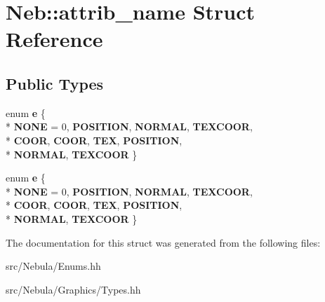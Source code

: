 \hypertarget{structNeb_1_1attrib__name}{\section{Neb\-:\-:attrib\-\_\-name Struct Reference}
\label{structNeb_1_1attrib__name}
}
\subsection*{Public Types}
\begin{DoxyCompactItemize}
\item 
enum {\bfseries e} \{ \\*
{\bfseries N\-O\-N\-E} = 0, 
{\bfseries P\-O\-S\-I\-T\-I\-O\-N}, 
{\bfseries N\-O\-R\-M\-A\-L}, 
{\bfseries T\-E\-X\-C\-O\-O\-R}, 
\\*
{\bfseries C\-O\-O\-R}, 
{\bfseries C\-O\-O\-R}, 
{\bfseries T\-E\-X}, 
{\bfseries P\-O\-S\-I\-T\-I\-O\-N}, 
\\*
{\bfseries N\-O\-R\-M\-A\-L}, 
{\bfseries T\-E\-X\-C\-O\-O\-R}
 \}
\item 
enum {\bfseries e} \{ \\*
{\bfseries N\-O\-N\-E} = 0, 
{\bfseries P\-O\-S\-I\-T\-I\-O\-N}, 
{\bfseries N\-O\-R\-M\-A\-L}, 
{\bfseries T\-E\-X\-C\-O\-O\-R}, 
\\*
{\bfseries C\-O\-O\-R}, 
{\bfseries C\-O\-O\-R}, 
{\bfseries T\-E\-X}, 
{\bfseries P\-O\-S\-I\-T\-I\-O\-N}, 
\\*
{\bfseries N\-O\-R\-M\-A\-L}, 
{\bfseries T\-E\-X\-C\-O\-O\-R}
 \}
\end{DoxyCompactItemize}


The documentation for this struct was generated from the following files\-:\begin{DoxyCompactItemize}
\item 
src/\-Nebula/Enums.\-hh\item 
src/\-Nebula/\-Graphics/Types.\-hh\end{DoxyCompactItemize}
